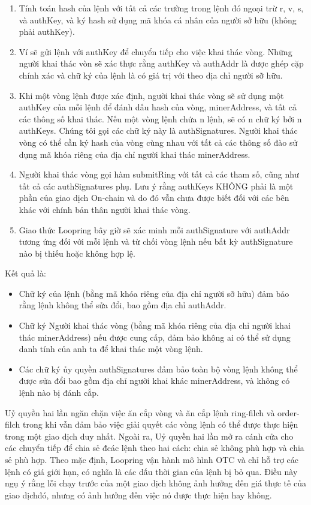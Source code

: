 \documentclass[12pt,a4paper]{article}
\begin{document}
\begin{multicols}{2}
\begin{enumerate}
  \item Tính toán hash của lệnh với tất cả các trường trong lệnh đó ngoại trừ r,  v,  s,  và  authKey, và ký hash sử dụng mã khóa cá nhân của người sở hữu (không phải authKey).

  \item Ví sẽ gửi lệnh với authKey để chuyển tiếp cho việc khai thác vòng. Những người khai thác vòn sẽ xác thực rằng authKey và authAddr là được ghép cặp chính xác và chữ ký của lệnh là có giá trị với theo địa chỉ người sỡ hữu.

  \item Khi một vòng lệnh được xác định, người khai thác vòng sẽ sử dụng một authKey của mỗi lệnh để đánh dấu hash của vòng, minerAddress, và tất cả các thông số khai thác. Nếu một vòng lệnh chứa n lệnh, sẽ có n chữ ký bởi n authKeys.  Chúng tôi gọi các chữ ký này là authSignatures.  Người khai thác vòng có thể cần ký hash của vòng cùng nhau với tất cả các thông số đào sử dụng mã khóa riêng của địa chỉ người khai thác minerAddress.

  \item Người khai thác vòng gọi hàm submitRing với tất cả các tham số, cũng như tất cả các authSignatures phụ. Lưu ý rằng authKeys KHÔNG phải là một phần của giao dịch On-chain và do đó vẫn chưa được biết đối với các bên khác với chính bản thân người khai thác vòng.


  \item Giao thức Loopring bây giờ sẽ xác minh mỗi authSignature với authAddr tương ứng đối với mỗi lệnh và từ chối vòng lệnh nếu bất kỳ authSignature nào bị thiếu hoặc không hợp lệ.

\end{enumerate}
Kết quả là:
\begin{itemize}

  \item  Chữ ký của lệnh (bằng mã khóa riêng của địa chỉ người sỡ hữu) đảm bảo rằng lệnh không thể sửa đổi, bao gồm địa chỉ authAddr.
  \item  Chữ ký Người khai thác vòng (bằng mã khóa riêng của địa chỉ người khai thác minerAddress) nếu được cung cấp, đảm bảo không ai có thể sử dụng danh tính của anh ta để khai thác một vòng lệnh.
  \item  Các chữ ký ủy quyền authSignatures  đảm bảo toàn bộ vòng lệnh không thể được sửa đổi bao gồm  địa chỉ người khai khác minerAddress, và không có lệnh nào bị đánh cắp.

\end{itemize}
Uỷ quyền hai lần ngăn chặn việc ăn cắp vòng và ăn cắp lệnh ring-filch và order-filch trong khi vẫn đảm bảo việc giải quyết các vòng lệnh có thể được thực hiện trong một giao dịch duy nhất. Ngoài ra, Uỷ quyền hai lần mở ra cánh cửa cho các chuyển tiếp để chia sẻ đcác lệnh theo hai cách: chia sẻ không phù hợp và chia sẻ phù hợp. Theo mặc định, Loopring vận hành mô hình OTC và chỉ hỗ trợ các lệnh có giá giới hạn, có nghĩa là các dấu thời gian của lệnh bị bỏ qua. Điều này ngụ ý rằng lỗi chạy trước của một giao dịch không ảnh hưởng đến giá thực tế của giao dịchđó, nhưng có ảnh hưởng đến việc nó được thực hiện hay không.

\end{multicols}
\end{document}

